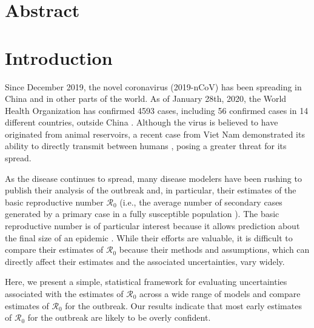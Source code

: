 \documentclass[12pt]{article}
\date{\today}
\begin{document}
\begin{flushleft}{
	\Large
	\textbf{}
}

\bigskip

\end{flushleft}

\section*{Abstract}

\pagebreak

\section{Introduction}

Since December 2019, the novel coronavirus (2019-nCoV) has been
spreading in China and in other parts of the world.
As of January 28th, 2020, the World Health Organization has
confirmed 4593 cases, including 56 confirmed cases in 14 different
countries, outside China \citep{who28report}.
Although the virus is believed to have originated
from animal reservoirs, a recent case from Viet Nam
demonstrated its ability to directly transmit between
humans \citep{who26report},
posing a greater threat for its spread.

As the disease continues to spread, 
many disease modelers have been rushing to publish their 
analysis of the outbreak and, in particular, their
estimates of the basic reproductive number $\mathcal R_0$ (i.e., the 
average number of secondary cases generated 
by a primary case in a fully susceptible population \citep{anderson1991infectious, diekmann1990definition}).
The basic reproductive number is of particular interest 
because it allows prediction about the final size of an epidemic \citep{anderson1991infectious, ma2006generality, arino2007final, andreasen2011final, miller2012note}.
While their efforts are valuable, it is difficult to
compare their estimates of $\mathcal R_0$ because their methods 
and assumptions, which can directly affect their estimates and
the associated uncertainties, vary widely.

Here, we present a simple, statistical framework for evaluating uncertainties 
associated with the estimates of $\mathcal R_0$
across a wide range of models and compare estimates of $\mathcal R_0$ for the outbreak.
Our results indicate that most early estimates of $\mathcal R_0$ for the outbreak
are likely to be overly confident.
\end{document}
